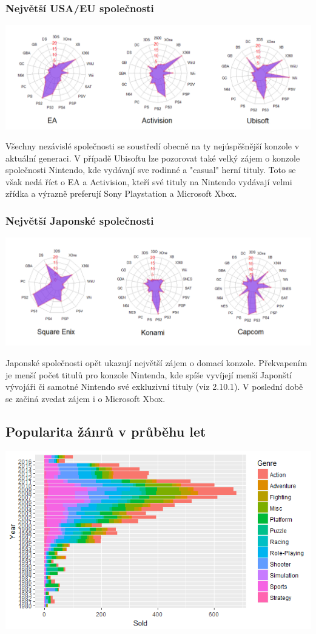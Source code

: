 \documentclass[a4paper,11pt]{article}
\begin{document}
\subsubsection{Největší USA/EU společnosti}
\includegraphics[scale=0.5]{EA}

Všechny nezávislé společnosti se soustředí obecně na ty nejúspěšnější konzole v aktuální generaci. V případě Ubisoftu lze pozorovat také velký zájem o konzole společnosti Nintendo, kde vydávají sve rodinné a "casual" herní tituly. Toto se však nedá říct o EA a Activision, kteří své tituly na Nintendo vydávají velmi zřídka a výrazně preferují Sony Playstation a Microsoft Xbox.

\subsubsection{Největší Japonské společnosti}
\includegraphics[scale=0.5]{capcom}

Japonské společnosti opět ukazují největší zájem o domací konzole. Překvapením je menší počet titulů pro konzole Nintenda, kde spíše vyvíjejí menší Japonští vývojáři či samotné Nintendo své exkluzivní tituly (viz 2.10.1). V poslední době se začiná zvedat zájem i o Microsoft Xbox.


\newpage

\subsection{Popularita žánrů v průběhu let}
\includegraphics[scale=0.8]{Rplot19}
\end{document}
